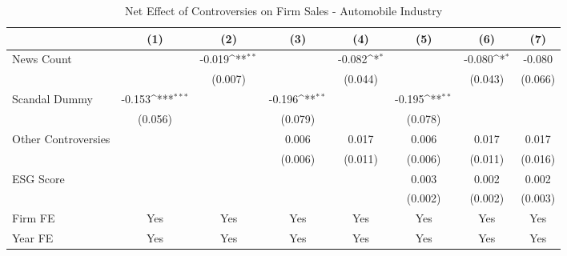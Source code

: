 \begin{table}[htbp]\centering
\def\sym#1{\ifmmode^{#1}\else\(^{#1}\)\fi}
\caption{Net Effect of Controversies on Firm Sales - Automobile Industry}
\begin{tabular}{l*{7}{c}}
\toprule
                    &\multicolumn{1}{c}{(1)}         &\multicolumn{1}{c}{(2)}         &\multicolumn{1}{c}{(3)}         &\multicolumn{1}{c}{(4)}         &\multicolumn{1}{c}{(5)}         &\multicolumn{1}{c}{(6)}         &\multicolumn{1}{c}{(7)}         \\
\midrule
News Count          &                     &      -0.019\sym{**} &                     &      -0.082\sym{*}  &                     &      -0.080\sym{*}  &      -0.080         \\
                    &                     &     (0.007)         &                     &     (0.044)         &                     &     (0.043)         &     (0.066)         \\
\addlinespace
Scandal Dummy       &      -0.153\sym{***}&                     &      -0.196\sym{**} &                     &      -0.195\sym{**} &                     &                     \\
                    &     (0.056)         &                     &     (0.079)         &                     &     (0.078)         &                     &                     \\
\addlinespace
Other Controversies &                     &                     &       0.006         &       0.017         &       0.006         &       0.017         &       0.017         \\
                    &                     &                     &     (0.006)         &     (0.011)         &     (0.006)         &     (0.011)         &     (0.016)         \\
\addlinespace
ESG Score           &                     &                     &                     &                     &       0.003         &       0.002         &       0.002         \\
                    &                     &                     &                     &                     &     (0.002)         &     (0.002)         &     (0.003)         \\
\midrule
Firm FE             &         Yes         &         Yes         &         Yes         &         Yes         &         Yes         &         Yes         &         Yes         \\
Year FE             &         Yes         &         Yes         &         Yes         &         Yes         &         Yes         &         Yes         &         Yes         \\

\end{tabular}
\end{table}
